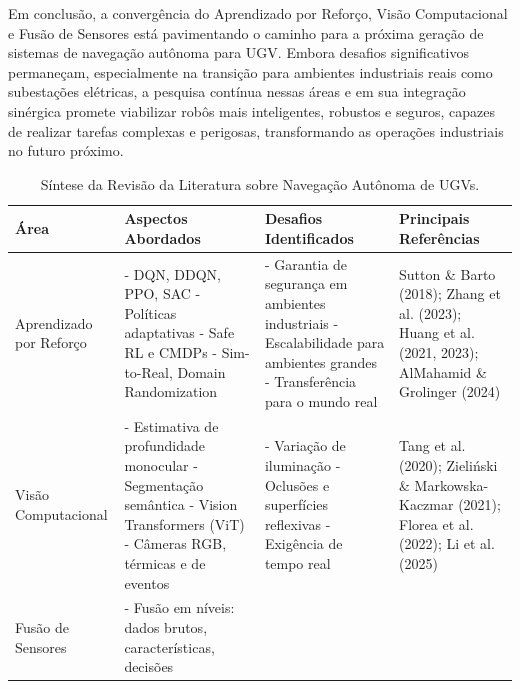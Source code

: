 Em conclusão, a convergência do Aprendizado por Reforço, Visão Computacional e Fusão de Sensores está pavimentando o caminho para a próxima geração de sistemas de navegação autônoma para \ac{UGV}. Embora desafios significativos permaneçam, especialmente na transição para ambientes industriais reais como subestações elétricas, a pesquisa contínua nessas áreas e em sua integração sinérgica promete viabilizar robôs mais inteligentes, robustos e seguros, capazes de realizar tarefas complexas e perigosas, transformando as operações industriais no futuro próximo.

\begin{table}[H]
    \centering
    \caption{Síntese da Revisão da Literatura sobre Navegação Autônoma de UGVs.}
    \label{tab:sintese_literatura}
    \begin{tabularx}{\textwidth}{|l|X|X|X|}
        \hline
        \textbf{Área} & \textbf{Aspectos Abordados} & \textbf{Desafios Identificados} & \textbf{Principais Referências} \\
        \hline
        Aprendizado por Reforço & 
        - DQN, DDQN, PPO, SAC \newline 
        - Políticas adaptativas \newline 
        - Safe RL e CMDPs \newline 
        - Sim-to-Real, Domain Randomization &
        - Garantia de segurança em ambientes industriais \newline 
        - Escalabilidade para ambientes grandes \newline 
        - Transferência para o mundo real &
        Sutton \& Barto (2018); Zhang et al. (2023); Huang et al. (2021, 2023); AlMahamid \& Grolinger (2024) \\
        \hline
        Visão Computacional &
        - Estimativa de profundidade monocular \newline 
        - Segmentação semântica \newline 
        - Vision Transformers (ViT) \newline 
        - Câmeras RGB, térmicas e de eventos &
        - Variação de iluminação \newline 
        - Oclusões e superfícies reflexivas \newline 
        - Exigência de tempo real &
        Tang et al. (2020); Zieliński \& Markowska-Kaczmar (2021); Florea et al. (2022); Li et al. (2025) \\
        \hline
        Fusão de Sensores &
        - Fusão em níveis: dados brutos, características, decisões \newline 

\end{tabularx}
\end{table}
